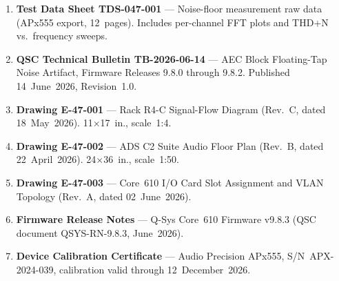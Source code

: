 \documentclass[11pt,letterpaper]{article}
\begin{document}
\begin{enumerate}[leftmargin=*, label=\textbf{ATT-\arabic*:}, itemsep=4pt]
  \item \textbf{Test Data Sheet TDS-047-001} --- Noise-floor measurement raw
        data (APx555 export, 12~pages). Includes per-channel FFT plots and
        THD+N vs.\ frequency sweeps.

  \item \textbf{QSC Technical Bulletin TB-2026-06-14} --- AEC Block
        Floating-Tap Noise Artifact, Firmware Releases 9.8.0 through 9.8.2.
        Published 14~June~2026, Revision~1.0.

  \item \textbf{Drawing E-47-001} --- Rack R4-C Signal-Flow Diagram
        (Rev.\ C, dated 18~May~2026). 11$\times$17~in., scale~1:4.

  \item \textbf{Drawing E-47-002} --- ADS C2 Suite Audio Floor Plan
        (Rev.\ B, dated 22~April~2026). 24$\times$36~in., scale~1:50.

  \item \textbf{Drawing E-47-003} --- Core~610 I/O Card Slot Assignment
        and VLAN Topology (Rev.\ A, dated 02~June~2026).

  \item \textbf{Firmware Release Notes} --- Q-Sys Core~610 Firmware
        v9.8.3 (QSC document QSYS-RN-9.8.3, June~2026).

  \item \textbf{Device Calibration Certificate} --- Audio Precision APx555,
        S/N~APX-2024-039, calibration valid through 12~December~2026.

\end{enumerate}
\end{document}
